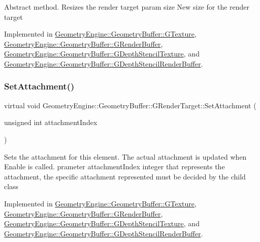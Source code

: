 Abstract method. Resizes the render target param size New size for the render target 

Implemented in \mbox{\hyperlink{class_geometry_engine_1_1_geometry_buffer_1_1_g_texture_a17c5c626b214d8d0bfb9988b52376a55}{Geometry\+Engine\+::\+Geometry\+Buffer\+::\+G\+Texture}}, \mbox{\hyperlink{class_geometry_engine_1_1_geometry_buffer_1_1_g_render_buffer_a3a3e0b2e031cce1c0bea9c2a4bc5465a}{Geometry\+Engine\+::\+Geometry\+Buffer\+::\+G\+Render\+Buffer}}, \mbox{\hyperlink{class_geometry_engine_1_1_geometry_buffer_1_1_g_depth_stencil_texture_a692ca73521e51be802c981ab05029369}{Geometry\+Engine\+::\+Geometry\+Buffer\+::\+G\+Depth\+Stencil\+Texture}}, and \mbox{\hyperlink{class_geometry_engine_1_1_geometry_buffer_1_1_g_depth_stencil_render_buffer_aee7b6a5ecc14a2aac4c6f363fa609720}{Geometry\+Engine\+::\+Geometry\+Buffer\+::\+G\+Depth\+Stencil\+Render\+Buffer}}.

\mbox{\label{class_geometry_engine_1_1_geometry_buffer_1_1_g_render_target_a1031c44ad374654e2183d3b1b99638a3}} 
\subsubsection{\texorpdfstring{SetAttachment()}{SetAttachment()}}
{\footnotesize\ttfamily virtual void Geometry\+Engine\+::\+Geometry\+Buffer\+::\+G\+Render\+Target\+::\+Set\+Attachment (\begin{DoxyParamCaption}\item[{unsigned int}]{attachment\+Index }\end{DoxyParamCaption})\hspace{0.3cm}{\ttfamily [pure virtual]}}

Sets the attachment for this element. The actual attachment is updated when Enable is called. prameter attachment\+Index integer that represents the attachment, the specific attachment represented must be decided by the child class 

Implemented in \mbox{\hyperlink{class_geometry_engine_1_1_geometry_buffer_1_1_g_texture_a30c0e98fd265c6f47fe7df0ad4f39644}{Geometry\+Engine\+::\+Geometry\+Buffer\+::\+G\+Texture}}, \mbox{\hyperlink{class_geometry_engine_1_1_geometry_buffer_1_1_g_render_buffer_adb0c62f7d9fb1d61b3ea84bc026fa539}{Geometry\+Engine\+::\+Geometry\+Buffer\+::\+G\+Render\+Buffer}}, \mbox{\hyperlink{class_geometry_engine_1_1_geometry_buffer_1_1_g_depth_stencil_texture_aa4b676746b13f4ea748450ea19ca711a}{Geometry\+Engine\+::\+Geometry\+Buffer\+::\+G\+Depth\+Stencil\+Texture}}, and \mbox{\hyperlink{class_geometry_engine_1_1_geometry_buffer_1_1_g_depth_stencil_render_buffer_af2877932c33e892f310de1c07ad69a20}{Geometry\+Engine\+::\+Geometry\+Buffer\+::\+G\+Depth\+Stencil\+Render\+Buffer}}.



